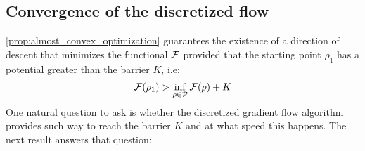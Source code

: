 \subsection{Convergence of the discretized flow}

\cref{prop:almost_convex_optimization} guarantees the existence of a direction of descent that minimizes the functional ${{\mathcal F}}$ provided that the starting point $\rho_1$ has a potential greater than the barrier $K$, i.e:
\begin{align}\label{eq:barrier_condition}
	{{\mathcal F}}(\rho_1)> \inf_{\rho\in \mathcal{P}} {{\mathcal F}}(\rho) + K
\end{align}
One natural question to ask is whether the  discretized gradient flow algorithm provides such way to reach the barrier $K$ and at what speed this happens. The next result answers that question:   

